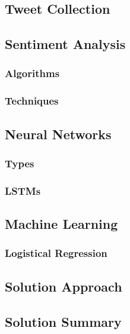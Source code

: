 \documentclass[oneside, 10pt]{article}
\begin{document}
			\subsection{Tweet Collection}\label{tweet_collection}
		
			\subsection{Sentiment Analysis}\label{sentiment}
	
			\subsubsection{Algorithms}\label{algorithms}
			\subsubsection{Techniques}\label{techniques}
			
		\subsection{Neural Networks}\label{networks}
			\subsubsection{Types}\label{types}
			\subsubsection{LSTMs}\label{lstms}
		
		\subsection{Machine Learning}\label{machine}
			\subsubsection{Logistical Regression}
		
	\newpage
	
	\begin{center}
		\section{Solution Approach}\label{solution}
	\end{center}
	
		\subsection{Solution Summary}\label{sumary}
		
\end{document}
